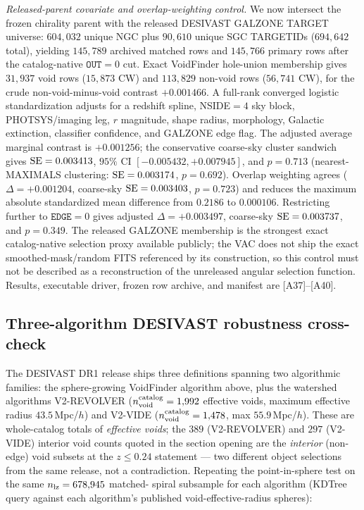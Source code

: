 \documentclass[aps,prd,twocolumn,superscriptaddress,showpacs,preprintnumbers,nofootinbib,longbibliography,floatfix]{revtex4-2}
\begin{document}
\emph{Released-parent covariate and overlap-weighting control.} We now
intersect the frozen chirality parent with the released DESIVAST GALZONE
TARGET universe: $604{,}032$ unique NGC plus $90{,}610$ unique SGC TARGETIDs
($694{,}642$ total), yielding $145{,}789$ archived matched rows and
$145{,}766$ primary rows after the catalog-native $\mathtt{OUT}=0$ cut.
Exact VoidFinder hole-union membership gives $31{,}937$ void rows
($15{,}873$ CW) and $113{,}829$ non-void rows ($56{,}741$ CW), for the crude
non-void-minus-void contrast $+0.001466$. A full-rank converged logistic
standardization adjusts for a redshift spline, NSIDE$=4$ sky block,
PHOTSYS/imaging leg, $r$ magnitude, shape radius, morphology, Galactic
extinction, classifier confidence, and GALZONE edge flag. The adjusted
average marginal contrast is $+0.001256$; the conservative coarse-sky
cluster sandwich gives ${\rm SE}=0.003413$, $95\%$ CI
$[-0.005432,+0.007945]$, and $p=0.713$ (nearest-MAXIMALS clustering:
${\rm SE}=0.003174$, $p=0.692$). Overlap weighting agrees
($\Delta=+0.001204$, coarse-sky ${\rm SE}=0.003403$, $p=0.723$) and reduces
the maximum absolute standardized mean difference from $0.2186$ to
$0.000106$. Restricting further to $\mathtt{EDGE}=0$ gives adjusted
$\Delta=+0.003497$, coarse-sky ${\rm SE}=0.003737$, and $p=0.349$.
The released GALZONE membership is the strongest exact catalog-native
selection proxy available publicly; the VAC does not ship the exact
smoothed-mask/random FITS referenced by its construction, so this control
must not be described as a reconstruction of the unreleased angular
selection function. Results, executable driver, frozen row archive, and
manifest are [A37]--[A40].

\subsection{Three-algorithm DESIVAST robustness cross-check}\label{sec:desivast_three_algo}

The DESIVAST DR1 release ships three definitions spanning two algorithmic families: the
sphere-growing VoidFinder algorithm above, plus the watershed
algorithms V2-REVOLVER ($n_{\rm void}^{\rm catalog} = 1{,}992$ effective
voids, maximum effective radius $43.5\,$Mpc/$h$) and V2-VIDE
($n_{\rm void}^{\rm catalog} = 1{,}478$, max $55.9\,$Mpc/$h$). These are
whole-catalog totals of \emph{effective voids}; the $389$ (V2-REVOLVER)
and $297$ (V2-VIDE) interior void counts quoted in the section opening are the
\emph{interior} (non-edge) void subsets at the $z \le 0.24$ statement
— two different object selections from the same release, not a
contradiction. Repeating
the point-in-sphere test on the same $n_{\rm lz} = 678{,}945$ matched-
spiral subsample for each algorithm (KDTree query against each
algorithm's published void-effective-radius spheres):
\end{document}
